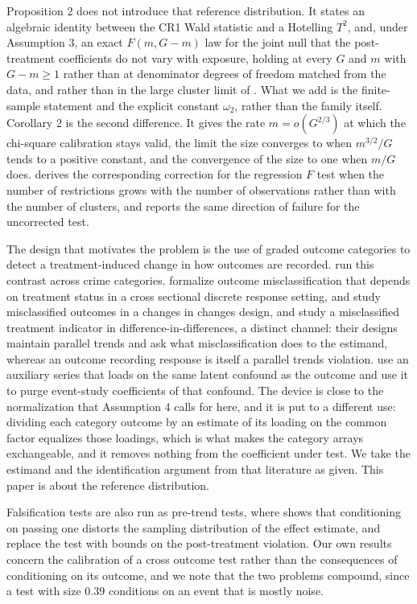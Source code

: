 \documentclass[12pt]{article}
\theoremstyle{definition}
\numberwithin{equation}{section}
\begin{document}
Proposition 2 does not introduce that reference distribution.
It states an algebraic identity between the CR1 Wald statistic and a Hotelling
$T^2$, and, under Assumption 3, an exact $F(m,G-m)$ law for the joint
null that the post-treatment coefficients do not vary with exposure, holding at
every $G$ and $m$ with $G - m \ge 1$ rather than at denominator degrees of
freedom matched from the data, and rather than in the large cluster limit of
\citet{bester2011cluster}. What we add is the finite-sample statement and
the explicit constant $\omega_2$, rather than the family itself. Corollary 2 is the second
difference. It gives the rate $m = o(G^{2/3})$ at which the chi-square calibration stays valid, the limit the size converges to when $m^{3/2}/G$ tends
to a positive constant, and the convergence of the size to one when $m/G$ does.
\citet{calhoun2011testing} derives the corresponding correction for the
regression $F$ test when the number of restrictions grows with the number of
observations rather than with the number of clusters, and reports the same
direction of failure for the uncorrected test.

The design that motivates the problem is the use of graded outcome categories to
detect a treatment-induced change in how outcomes are recorded.
\citet{weisburd2024crs} run this contrast across crime categories.
\citet{hausman1998misclassification} formalize outcome misclassification that
depends on treatment status in a cross sectional discrete response setting, and
\citet{gutknecht2024cic} study misclassified outcomes in a changes in changes
design, and \citet{denteh2022misclassdid} study a misclassified treatment
indicator in difference-in-differences, a distinct channel: their designs
maintain parallel trends and ask what misclassification does to the estimand,
whereas an outcome recording response is itself a parallel trends violation. \citet{fhs2019pretrends} use an auxiliary series that loads
on the same latent confound as the outcome and use it to purge event-study coefficients of that confound. The device is close to the normalization that
Assumption 4 calls for here, and it is put to a different use:
dividing each category outcome by an estimate of its loading on the common
factor equalizes those loadings, which is what makes the category arrays
exchangeable, and it removes nothing from the coefficient under test. We take the
estimand and the identification argument from that literature as given. This
paper is about the reference distribution.

Falsification tests are also run as pre-trend tests, where
\citet{roth2022pretest} shows that conditioning on passing one distorts the
sampling distribution of the effect estimate, and \citet{rambachan2023credible}
replace the test with bounds on the post-treatment violation. Our own results concern the calibration of a cross outcome test rather than the
consequences of conditioning on its outcome, and we note that the two problems
compound, since a test with size $0.39$ conditions on an event that is mostly
noise.
\end{document}
